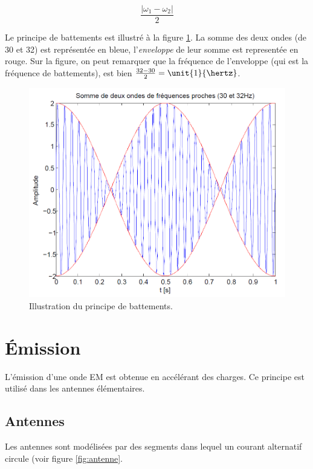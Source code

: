 $$\frac{|\omega_1 - \omega_2|}{2}$$


Le principe de battements est illustré à la figure \ref{fig:battements}.
La somme des deux ondes (de \unit{30}{\hertz} et \unit{32}{\hertz})
est représentée en bleue, l'\emph{enveloppe} de leur somme est representée en rouge.
Sur la figure, on peut remarquer que la fréquence de l'enveloppe (qui est la
fréquence de battements), est bien $\frac{32-30}{2} = \unit{1}{\hertz}$.

\begin{figure}[ht!]
	\centering
	\includegraphics[scale=0.7]{img/battements.png}
	\caption{Illustration du principe de battements.}
	\label{fig:battements}
\end{figure}

\section{Émission}
L'émission d'une onde EM est obtenue en accélérant des charges.
Ce principe est utilisé dans les antennes élémentaires.

\subsection{Antennes}
Les antennes sont modélisées par des segments dans lequel un courant
alternatif circule (voir figure \ref{fig:antenne}.

